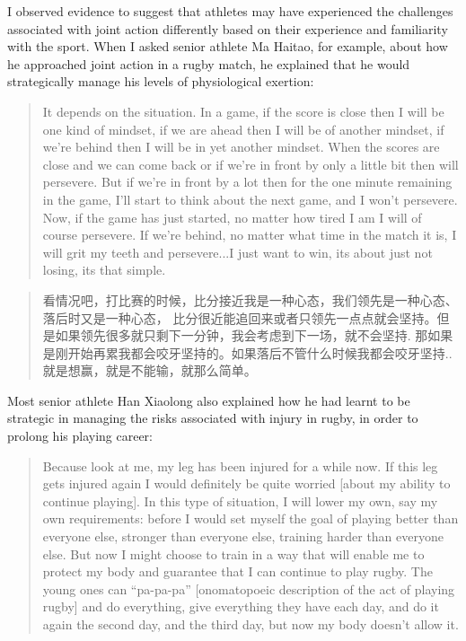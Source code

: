 \begin{CJK}{UTF8}{gbsn}
I observed evidence to suggest that athletes may have experienced the challenges associated with joint action differently based on their experience and familiarity with the sport.  When I asked senior athlete Ma Haitao, for example, about how he approached joint action in a rugby match, he explained that he would strategically manage his levels of physiological exertion:

    \begin{quote}
      It depends on the situation.  In a game, if the score is close then I will be one kind of mindset, if we are ahead then I will be of another mindset, if we're behind then I will be in yet another mindset.  When the scores are close and we can come back or if we're in front by only a little bit then will persevere.  But if we're in front by a lot then for the one minute remaining in the game, I'll start to think about the next game, and I won't persevere.  Now, if the game has just started, no matter how tired I am I will of course persevere. If we're behind, no matter what time in the match it is, I will grit my teeth and persevere...I just want to win, its about just not losing, its that simple.
    \end{quote}

    \begin{quote}
      看情况吧，打比赛的时候，比分接近我是一种心态，我们领先是一种心态、落后时又是一种心态， 比分很近能追回来或者只领先一点点就会坚持。但是如果领先很多就只剩下一分钟，我会考虑到下一场，就不会坚持.  那如果是刚开始再累我都会咬牙坚持的。如果落后不管什么时候我都会咬牙坚持..就是想赢，就是不能输，就那么简单。
    \end{quote}

Most senior athlete Han Xiaolong also explained how he had learnt to be strategic in managing the risks associated with injury in rugby, in order to prolong his playing career:

    \begin{quote}
      Because look at me, my leg has been injured for a while now.  If this leg gets injured again I would definitely be quite worried [about my ability to continue playing]. In this type of situation, I will lower my own, say my own requirements: before I would set myself the goal of playing better than everyone else, stronger than everyone else, training harder than everyone else.  But now I might choose to train in a way that will enable me to protect my body and guarantee that I can continue to play rugby.  The young ones can ``pa-pa-pa'' [onomatopoeic description of the act of playing rugby] and do everything, give everything they have each day, and do it again the second day, and the third day, but now my body doesn't allow it.
    \end{quote}


\end{CJK}
